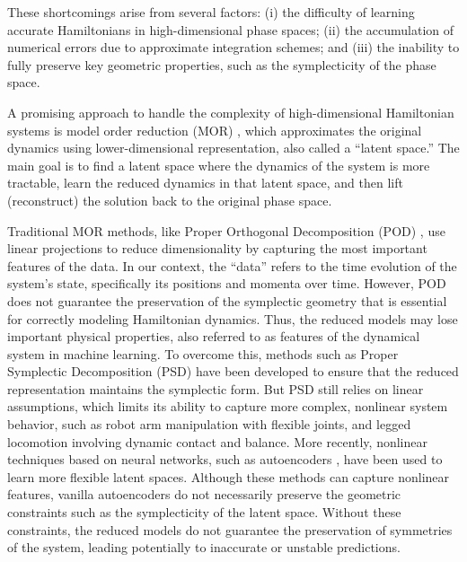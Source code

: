 \documentclass{article}
\theoremstyle{plain}
\theoremstyle{definition}
\theoremstyle{remark}
\begin{document}
These shortcomings arise from several factors: (i) the difficulty of learning accurate Hamiltonians in high-dimensional phase spaces; (ii) the accumulation of numerical errors due to approximate integration schemes; and (iii) the inability to fully preserve key geometric properties, such as the symplecticity of the phase space.

A promising approach to handle the complexity of high-dimensional Hamiltonian systems is model order reduction (MOR) \cite{model_order_reduction, buchfink2024modelreductionmanifoldsdifferential}, which approximates the original dynamics using lower-dimensional representation, also called a “latent space.” The main goal is to find a latent space where the dynamics of the system is more tractable, learn the reduced dynamics in that latent space, and then lift (reconstruct) the solution back to the original phase space.

Traditional MOR methods, like Proper Orthogonal Decomposition (POD) \cite{berkooz_pod}, use linear projections to reduce dimensionality by capturing the most important features of the data. In our context, the “data” refers to the time evolution of the system’s state, specifically its positions and momenta over time. However, POD does not guarantee the preservation of the symplectic geometry that is essential for correctly modeling Hamiltonian dynamics. Thus, the reduced models may lose important physical properties, also referred to as features of the dynamical system in machine learning. To overcome this, methods such as Proper Symplectic Decomposition (PSD) \cite{peng2015symplecticmodelreductionhamiltonian} have been developed to ensure that the reduced representation maintains the symplectic form. But PSD still relies on linear assumptions, which limits its ability to capture more complex, nonlinear system behavior, such as robot arm manipulation with flexible joints, and legged locomotion involving dynamic contact and balance. More recently, nonlinear techniques based on neural networks, such as autoencoders \cite{bank2021autoencoders, côte2024hamiltonianreductionusingconvolutional, venkat2021convolutionalautoencodersreducedordermodeling}, have been used to learn more flexible latent spaces. Although these methods can capture nonlinear features, vanilla autoencoders do not necessarily preserve the geometric constraints such as the symplecticity of the latent space. Without these constraints, the reduced models do not guarantee the preservation of symmetries of the system, leading potentially to inaccurate or unstable predictions.
\end{document}
